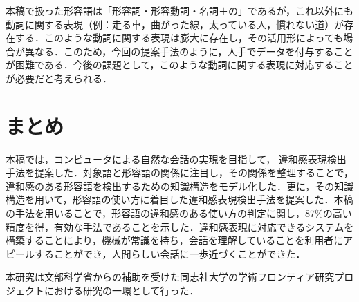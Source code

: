 \documentclass[japanese]{jnlp_1.4}
\begin{document}
本稿で扱った形容語は「形容詞・形容動詞・名詞＋の」であるが，これ以外にも動詞に関する表現（例：走る車，曲がった線，太っている人，慣れない道）が存在する．このような動詞に関する表現は膨大に存在し，その活用形によっても場合が異なる．このため，今回の提案手法のように，人手でデータを付与することが困難である．今後の課題として，このような動詞に関する表現に対応することが必要だと考えられる．


\section{まとめ}

本稿では，コンピュータによる自然な会話の実現を目指して，
\pagebreak
違和感表現検出手法を提案した．対象語と形容語の関係に注目し，その関係を整理することで，違和感のある形容語を検出するための知識構造をモデル化した．更に，その知識構造を用いて，形容語の使い方に着目した違和感表現検出手法を提案した．本稿の手法を用いることで，形容語の違和感のある使い方の判定に関し，87\%の高い精度を得，有効な手法であることを示した．違和感表現に対応できるシステムを構築することにより，機械が常識を持ち，会話を理解していることを利用者にアピールすることができ，人間らしい会話に一歩近づくことができた．




\acknowledgment
本研究は文部科学省からの補助を受けた同志社大学の学術フロンティア研究プロジェクトにおける研究の一環として行った．
\end{document}
